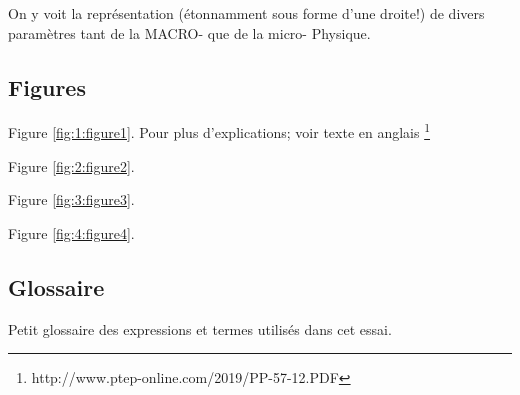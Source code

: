 \documentclass[a4paper,12pt]{article}
\begin{document}
On y voit la représentation (étonnamment sous forme d'une droite!) de divers paramètres tant de la MACRO- que de la micro- Physique.


\subsection{Figures}

Figure \ref{fig:1:figure1}. Pour plus d'explications; voir texte en anglais \footnote{http://www.ptep-online.com/2019/PP-57-12.PDF}

Figure \ref{fig:2:figure2}.

Figure \ref{fig:3:figure3}.

Figure \ref{fig:4:figure4}.


\begin{appendix}


\section{Glossaire}

Petit glossaire des expressions et termes utilisés dans cet essai.

\begin{itemize}


\end{itemize}
\end{appendix}
\end{document}
